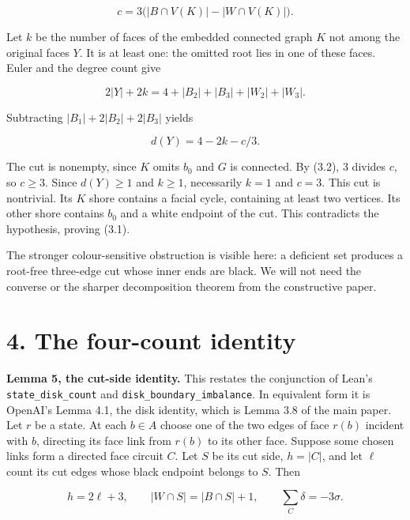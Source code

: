 \documentclass[a4paper,11pt]{amsart}
\begin{document}
\begin{equation*}
c=3\bigl(|B\cap V(K)|-|W\cap V(K)|\bigr).                         \tag{3.2}
\end{equation*}

Let $k$ be the number of faces of the embedded connected graph $K$ not among the original faces $Y$. It is at least one: the omitted root lies in one of these faces. Euler and the degree count give

\begin{equation*}
2|Y|+2k=4+|B_2|+|B_3|+|W_2|+|W_3|.
\end{equation*}

Subtracting $|B_1|+2|B_2|+2|B_3|$ yields

\begin{equation*}
d(Y)=4-2k-c/3.
\end{equation*}

The cut is nonempty, since $K$ omits $b_0$ and $G$ is connected. By (3.2), $3$ divides $c$, so $c\ge3$. Since $d(Y)\ge1$ and $k\ge1$, necessarily $k=1$ and $c=3$. This cut is nontrivial. Its $K$ shore contains a facial cycle, containing at least two vertices. Its other shore contains $b_0$ and a white endpoint of the cut. This contradicts the hypothesis, proving (3.1).

The stronger colour-sensitive obstruction is visible here: a deficient set produces a root-free three-edge cut whose inner ends are black. We will not need the converse or the sharper decomposition theorem from the constructive paper.

\section*{4. The four-count identity}

\textbf{Lemma 5, the cut-side identity.} This restates the conjunction of Lean's \nolinkurl{state_disk_count} and \nolinkurl{disk_boundary_imbalance}. In equivalent form it is OpenAI's Lemma 4.1, the disk identity, which is Lemma 3.8 of the main paper. Let $r$ be a state. At each $b\in A$ choose one of the two edges of face $r(b)$ incident with $b$, directing its face link from $r(b)$ to its other face. Suppose some chosen links form a directed face circuit $C$. Let $S$ be its cut side, $h=|C|$, and let $\ell$ count its cut edges whose black endpoint belongs to $S$. Then

\begin{equation*}
h=2\ell+3,\qquad |W\cap S|=|B\cap S|+1,\qquad
\sum_{C}\delta=-3\sigma.                                         \tag{4.1}
\end{equation*}
\end{document}
